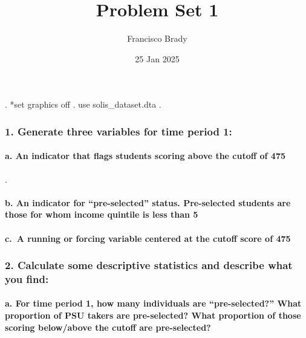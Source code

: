 \documentclass[
]{article}
\title{Problem Set 1}
\author{Francisco Brady}
\date{25 Jan 2025}
\begin{document}
\maketitle

\begin{stlog}
. *set graphics off
. use solis_dataset.dta
{\smallskip}
. 
\end{stlog}

\subsubsection{1. Generate three variables for time period
1:}\label{generate-three-variables-for-time-period-1}

\paragraph{a. An indicator that flags students scoring above the cutoff
of
475}\label{a.-an-indicator-that-flags-students-scoring-above-the-cutoff-of-475}

\begin{stlog}
. 
\end{stlog}

\paragraph{b. An indicator for ``pre-selected'' status. Pre-selected
students are those for whom income quintile is less than
5}\label{b.-an-indicator-for-pre-selected-status.-pre-selected-students-are-those-for-whom-income-quintile-is-less-than-5}

\paragraph{c.~A running or forcing variable centered at the cutoff score
of
475}\label{c.-a-running-or-forcing-variable-centered-at-the-cutoff-score-of-475}

\subsubsection{2. Calculate some descriptive statistics and describe
what you
find:}\label{calculate-some-descriptive-statistics-and-describe-what-you-find}

\paragraph{a. For time period 1, how many individuals are
``pre-selected?'' What proportion of PSU takers are pre-selected? What
proportion of those scoring below/above the cutoff are
pre-selected?}\label{a.-for-time-period-1-how-many-individuals-are-pre-selected-what-proportion-of-psu-takers-are-pre-selected-what-proportion-of-those-scoring-belowabove-the-cutoff-are-pre-selected}
\end{document}
